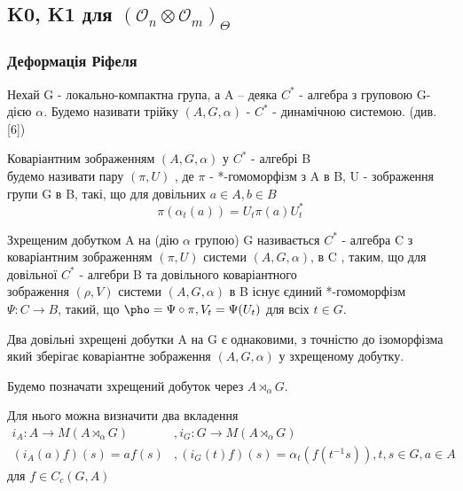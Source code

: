 \subsection{K0, K1 для $(\mathcal{O}_n \otimes \mathcal{O}_m)_\Theta$}
\subsubsection{Деформація Ріфеля}
Нехай G - локально-компактна група, а A -- деяка $C^*$ - алгебра з груповою
G-дією $\alpha$.
Будемо називати трійку $(A, G, \alpha)$ - $C^*$ - динамічною системою. (див. [6])

\begin{definition}
    Коваріантним зображенням $(A, G, \alpha)$ у $C^*$ - алгебрі B \\ будемо називати пару $(\pi, U)$
    , де $\pi$ - *-гомоморфізм з A в B, U - зображення групи G в B, такі, що для довільних
    $a \in A, b \in B$
    \begin{equation*}
        \pi(\alpha_t(a)) = U_t \pi(a) U_t^*
    \end{equation*}
\end{definition}

\begin{definition}
    Зхрещеним добутком A на (дію $\alpha$ групою) G називається $C^*$ - алгебра
    C з коваріантним зображенням $(\pi, U)$ системи $(A, G, \alpha)$, в C ,
    таким, що для довільної $C^*$ - алгебри B та довільного коваріантного \\ зображення
    $(\rho, V)$ системи $(A,G,\alpha)$ в B існує єдиний *-гомоморфізм $\Psi: C \to B$,
    такий, що $\pho = \Psi \circ \pi, V_t = \Psi(U_t)$ для всіх $t \in G$.
\end{definition}

\begin{proposition}
    Два довільні зхрещені добутки A на G є однаковими, з точністю до ізоморфізма
    який зберігає коваріантне зображення $(A,G,\alpha)$ у зхрещеному добутку.
\end{proposition}
Будемо позначати зхрещений добуток через  $A \rtimes_\alpha G$.

Для нього можна визначити два вкладення
\begin{align*}
    i_A: A \to M(A \rtimes_\alpha G)&, i_G: G \to M(A \rtimes_\alpha G) \\
    (i_A(a)f)(s) = a f(s)&, (i_G(t)f)(s) = \alpha_t(f(t^{-1}s)), t,s \in G, a \in A
\end{align*}
для $f \in C_c(G, A)$

